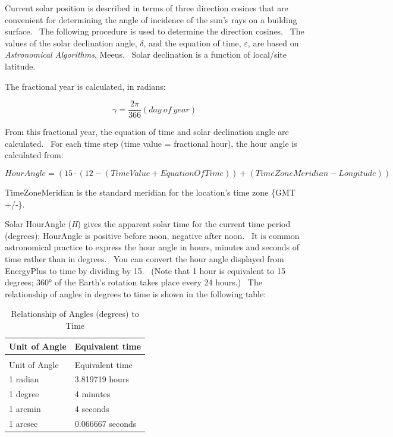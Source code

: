 Current solar position is described in terms of three direction cosines that are convenient for determining the angle of incidence of the sun's rays on a building surface.~ The following procedure is used to determine the direction cosines.~ The values of the solar declination angle, $\delta$, and the equation of time, $\varepsilon$, are based on \emph{Astronomical Algorithms}, Meeus.~ Solar declination is a function of local/site latitude.

The fractional year is calculated, in radians:

\begin{equation}
\gamma  = \frac{{2\pi }}{{366}}(day~of~year)
\end{equation}

From this fractional year, the equation of time and solar declination angle are calculated.~ For each time step (time value = fractional hour), the hour angle is calculated from:

\begin{equation}
HourAngle = \left( {15\cdot \left( {12 - \left( {TimeValue + EquationOfTime} \right)} \right) + \left( {TimeZoneMeridian - Longitude} \right)} \right)
\end{equation}

TimeZoneMeridian is the standard meridian for the location's time zone \{GMT +/-\}.

Solar HourAngle (\emph{H}) gives the apparent solar time for the current time period (degrees); HourAngle is positive before noon, negative after noon.~ It is common astronomical practice to express the hour angle in hours, minutes and seconds of time rather than in degrees.~ You can convert the hour angle displayed from EnergyPlus to time by dividing by 15.~ (Note that 1 hour is equivalent to 15 degrees; 360° of the Earth's rotation takes place every 24 hours.)~ The relationship of angles in degrees to time is shown in the following table:

\begin{longtable}[c]{@{}ll@{}}
\caption{Relationship of Angles (degrees) to Time \label{table:relationship-of-angles-degrees-to-time}} \tabularnewline
\toprule 
Unit of Angle & Equivalent time \tabularnewline
\midrule
\endfirsthead

\caption[]{Relationship of Angles (degrees) to Time} \tabularnewline
\toprule 
Unit of Angle & Equivalent time \tabularnewline
\midrule
\endhead

1 radian & 3.819719 hours \tabularnewline
1 degree & 4 minutes \tabularnewline
1 arcmin & 4 seconds \tabularnewline
1 arcsec & 0.066667 seconds \tabularnewline
\bottomrule
\end{longtable}

